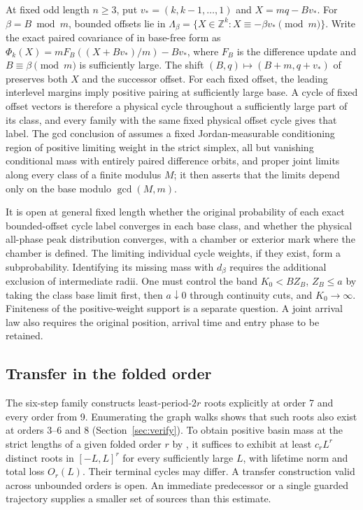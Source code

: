 \documentclass[11pt]{amsart}
\theoremstyle{definition}
\newcommand{\Z}{\mathbb Z}
\begin{document}
At fixed odd length \(n\ge3\), put
\(v_*=(k,k-1,\ldots,1)\) and \(X=mq-Bv_*\).
For \(\beta=B\bmod m\), bounded offsets lie in
\(\Lambda_\beta=\{X\in\Z^k:X\equiv-\beta v_*\pmod m\}\).
Write the exact paired covariance of \cite[Theorem~4 and Section~6]{G4}
in base-free form as \(\Phi_k(X)=mF_B((X+Bv_*)/m)-Bv_*\), where \(F_B\)
is the difference update and \(B\equiv\beta\pmod m\) is sufficiently
large. The shift \((B,q)\mapsto(B+m,q+v_*)\) of \cite{G4} preserves both
\(X\) and the successor offset. For each fixed offset, the leading
interlevel margins imply positive pairing at sufficiently large base. A
cycle of fixed offset vectors is therefore a physical cycle throughout a
sufficiently large part of its class, and every family with the same
fixed physical offset cycle gives that label. The gcd conclusion of
\cite[Theorem~4]{G4} assumes a fixed Jordan-measurable conditioning
region of positive limiting weight in the strict simplex, all but
vanishing conditional mass with entirely paired difference orbits, and
proper joint limits along every class of a finite modulus \(M\); it then
asserts that the limits depend only on the base modulo \(\gcd(M,m)\).

It is open at general fixed length whether the original
probability of each exact bounded-offset cycle label
converges in each base class, and whether the physical
all-phase peak distribution converges, with a chamber or
exterior mark where the chamber is defined. The limiting
individual cycle weights, if they exist, form a
subprobability. Identifying its missing mass with
\(d_\beta\) requires the additional exclusion of
intermediate radii. One must control the band
\(K_0<BZ_B\), \(Z_B\le a\) by taking the class base
limit first, then \(a\downarrow0\) through continuity
cuts, and \(K_0\to\infty\). Finiteness of the
positive-weight support is a separate question.
A joint arrival law also requires the original
position, arrival time and entry phase to be retained.

\subsection*{Transfer in the folded order}

The six-step family constructs least-period-\(2r\) roots explicitly at
order 7 and every order from 9. Enumerating the graph walks shows that
such roots also exist at orders 3--6 and 8 (Section~\ref{sec:verify}).
To obtain positive basin mass at the strict lengths of a given folded
order \(r\) by \cite[Proposition~7]{G10}, it suffices to exhibit at least \(c_rL^r\) distinct roots in
\([-L,L]^r\) for every sufficiently large \(L\), with lifetime norm and
total loss \(O_r(L)\). Their terminal cycles may differ. A transfer construction valid across
unbounded orders is open. An immediate predecessor or
a single guarded trajectory supplies a smaller set of
sources than this estimate.
\end{document}
